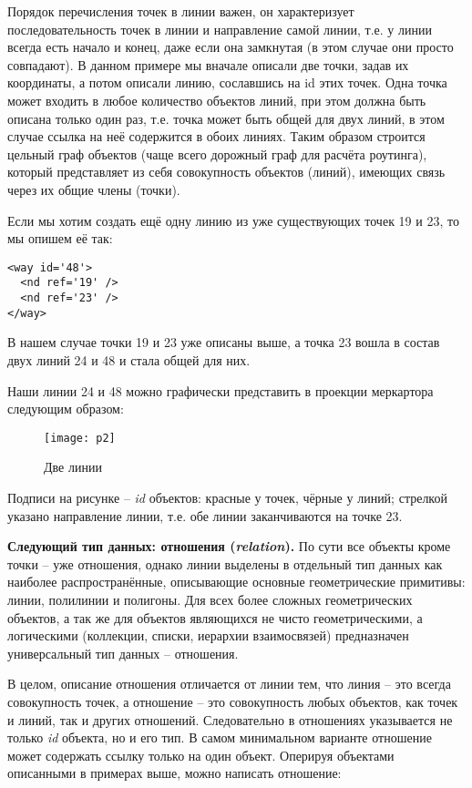 Порядок перечисления точек в линии важен, он характеризует последовательность 
точек в линии и направление самой линии, т.е. у линии всегда есть начало и 
конец, даже если она замкнутая (в этом случае они просто совпадают). В данном 
примере мы вначале описали две точки, задав их координаты, а потом описали 
линию, сославшись на id этих точек. Одна точка может входить в любое количество 
объектов линий, при этом должна быть описана только один раз, т.е. точка может 
быть общей для двух линий, в этом случае ссылка на неё содержится в обоих 
линиях. Таким образом строится цельный граф объектов (чаще всего дорожный граф 
для расчёта роутинга), который представляет из себя совокупность объектов 
(линий), имеющих связь через их общие члены (точки).

Если мы хотим создать ещё одну линию из уже существующих точек 19 и 23, то мы 
опишем её так:

\small
\begin{verbatim}
<way id='48'>
  <nd ref='19' />
  <nd ref='23' />
</way>
\end{verbatim}
\normalsize

В нашем случае точки 19 и 23 уже описаны выше, а точка 23 вошла в состав двух 
линий 24 и 48 и стала общей для них.

Наши линии 24 и 48 можно графически представить в проекции меркартора следующим 
образом:

\begin{figure}[ht!]
    \center
    \texttt{[image: p2]}
    \caption{Две линии}
\end{figure}

Подписи на рисунке -- \emph{id} объектов: красные у точек, чёрные у линий; 
стрелкой указано направление линии, т.е. обе линии заканчиваются на точке 23.

\textbf{Следующий тип данных: отношения (\emph{relation}).} По сути все 
объекты кроме точки -- уже отношения, однако линии выделены в отдельный тип 
данных как наиболее распространённые, описывающие основные геометрические 
примитивы: линии, полилинии и полигоны. Для всех более сложных геометрических 
объектов, а так же для объектов являющихся не чисто геометрическими, а 
логическими (коллекции, списки, иерархии взаимосвязей) предназначен 
универсальный тип данных -- отношения.

В целом, описание отношения отличается от линии тем, что линия -- это всегда 
совокупность точек, а отношение -- это совокупность любых объектов, как точек 
и линий, так и других отношений. Следовательно в отношениях указывается не 
только \emph{id} объекта, но и его тип. В самом минимальном варианте отношение 
может содержать ссылку только на один объект. Оперируя объектами описанными в 
примерах выше, можно написать отношение:

